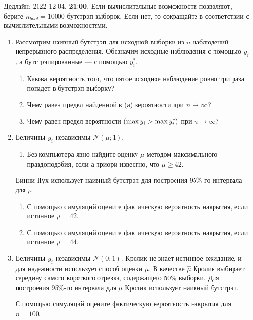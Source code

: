 \documentclass[12pt]{article}
\let\P\relax
\DeclareMathOperator{\P}{\mathbb{P}}
\newcommand \cN{\mathcal{N}}
\begin{document}
Дедлайн: 2022-12-04, \textbf{21:00}. Если вычислительные возможности позволяют, берите $n_{boot}=10000$ бутстрэп-выборок. 
Если нет, то сокращайте в соответствии с вычислительными возможностями. 

\begin{enumerate}

\item Рассмотрим наивный бутстрэп для исходной выборки из $n$ наблюдений непрерывного распределения. 
Обозначим исходные наблюдения с помощью $y_i$, а бутстрэпированные — с помощью $y_i^*$.

\begin{enumerate}
    \item Какова вероятность того, что пятое исходное наблюдение ровно три раза попадет в бутстрэп выборку?        
    \item Чему равен предел найденной в (а) вероятности при $n\to \infty$?
    \item Чему равен предел вероятности $\P(\max y_i > \max y_i^*)$ при $n\to \infty$?
\end{enumerate}




\item Величины $y_i$ независимы $\cN(\mu;1)$. 
\begin{enumerate}
    \item Без компьютера явно найдите оценку $\mu$  методом максимального правдоподобия,
    если а-приори известно, что $\mu \geq 42$.
    
\end{enumerate}
Винни-Пух использует наивный бутстрэп для построения 95\%-го  интервала для $\mu$. 
\begin{enumerate}[resume]
    \item С помощью симуляций оцените фактическую вероятность накрытия, если истинное $\mu = 42$.
    \item С помощью симуляций оцените фактическую вероятность накрытия, если истинное $\mu = 44$.
\end{enumerate}


\item Величины $y_i$ независимы $\cN(0;1)$. 
Кролик не знает истинное ожидание, и для надежности использует  способ оценки $\mu$. 
В качестве $\hat \mu$ Кролик выбирает середину самого короткого отрезка, содержащего 50\% выборки. 
Для построения 95\%-го интервала для $\mu$ Кролик использует наивный бутстрэп. 

С помощью симуляций оцените фактическую вероятность накрытия для $n=100$.


\end{enumerate}
\end{document}
